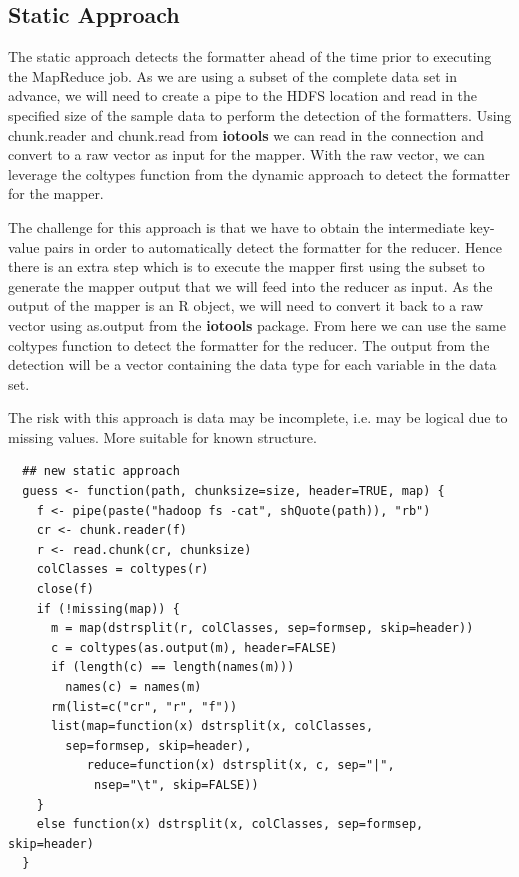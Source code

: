 \documentclass[11pt]{book}
\newcommand{\pkg}[1]{\textsf{ \bf #1}}
\begin{document}
\subsection{Static Approach}

The static approach detects the formatter ahead of the time prior to executing the MapReduce job. As we are using a subset of the complete data set in advance, we will need to create a pipe to the HDFS location and read in the specified size of the sample data to perform the detection of the formatters. Using chunk.reader and chunk.read from \pkg{iotools} we can read in the connection and convert to a raw vector as input for the mapper. With the raw vector, we can leverage the coltypes function from the dynamic approach to detect the formatter for the mapper.

The challenge for this approach is that we have to obtain the intermediate key-value pairs in order to automatically detect the formatter for the reducer. Hence there is an extra step which is to execute the mapper first using the subset to generate the mapper output that we will feed into the reducer as input. As the output of the mapper is an R object, we will need to convert it back to a raw vector using as.output from the \pkg{iotools} package. From here we can use the same coltypes function to detect the formatter for the reducer. The output from the detection will be a vector containing the data type for each variable in the data set.


The risk with this approach is data may be incomplete, i.e. may be logical due to missing values. More suitable for known structure.

\begin{verbatim}
  ## new static approach
  guess <- function(path, chunksize=size, header=TRUE, map) {
    f <- pipe(paste("hadoop fs -cat", shQuote(path)), "rb")
    cr <- chunk.reader(f)
    r <- read.chunk(cr, chunksize)
    colClasses = coltypes(r)
    close(f)
    if (!missing(map)) {
      m = map(dstrsplit(r, colClasses, sep=formsep, skip=header))
      c = coltypes(as.output(m), header=FALSE)
      if (length(c) == length(names(m)))
        names(c) = names(m)
      rm(list=c("cr", "r", "f"))
      list(map=function(x) dstrsplit(x, colClasses, 
      	sep=formsep, skip=header), 
           reduce=function(x) dstrsplit(x, c, sep="|", 
           	nsep="\t", skip=FALSE))
    }
    else function(x) dstrsplit(x, colClasses, sep=formsep, skip=header)
  }
  \end{verbatim}
\end{document}
